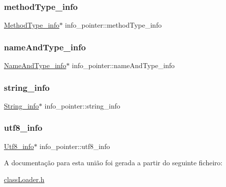 \subsubsection{\texorpdfstring{method\+Type\+\_\+info}{methodType\_info}}
{\footnotesize\ttfamily \hyperlink{struct_method_type__info}{Method\+Type\+\_\+info}$\ast$ info\+\_\+pointer\+::method\+Type\+\_\+info}

\hypertarget{unioninfo__pointer_a6fecafb432eea68dd658b66c527b2604}{}\label{unioninfo__pointer_a6fecafb432eea68dd658b66c527b2604} 
\subsubsection{\texorpdfstring{name\+And\+Type\+\_\+info}{nameAndType\_info}}
{\footnotesize\ttfamily \hyperlink{struct_name_and_type__info}{Name\+And\+Type\+\_\+info}$\ast$ info\+\_\+pointer\+::name\+And\+Type\+\_\+info}

\hypertarget{unioninfo__pointer_ab42897bc57d173f34b4ffc004dc0c9bf}{}\label{unioninfo__pointer_ab42897bc57d173f34b4ffc004dc0c9bf} 
\subsubsection{\texorpdfstring{string\+\_\+info}{string\_info}}
{\footnotesize\ttfamily \hyperlink{struct_string__info}{String\+\_\+info}$\ast$ info\+\_\+pointer\+::string\+\_\+info}

\hypertarget{unioninfo__pointer_a7a08700f711c4dbc7cbfeadb6b8fa4c2}{}\label{unioninfo__pointer_a7a08700f711c4dbc7cbfeadb6b8fa4c2} 
\subsubsection{\texorpdfstring{utf8\+\_\+info}{utf8\_info}}
{\footnotesize\ttfamily \hyperlink{struct_utf8__info}{Utf8\+\_\+info}$\ast$ info\+\_\+pointer\+::utf8\+\_\+info}



A documentação para esta união foi gerada a partir do seguinte ficheiro\+:\begin{DoxyCompactItemize}
\item 
\hyperlink{class_loader_8h}{class\+Loader.\+h}\end{DoxyCompactItemize}
